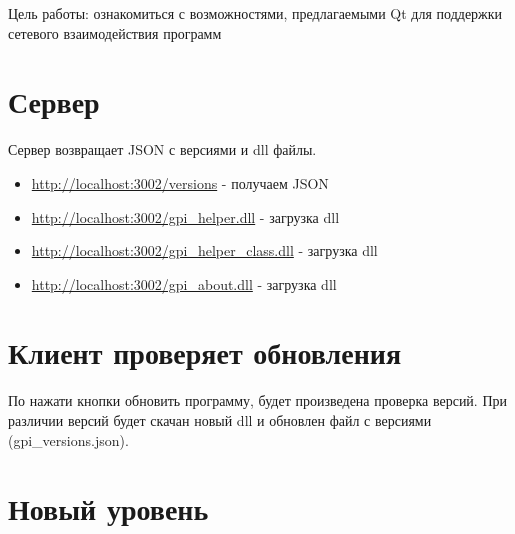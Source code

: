 

Цель работы:
ознакомиться с возможностями, предлагаемыми Qt для поддержки сетевого взаимодействия программ


\section{Сервер}

Сервер возвращает JSON с версиями и dll файлы.

\begin{itemize}
    \item \url{http://localhost:3002/versions} - получаем JSON
    \item \url{http://localhost:3002/gpi_helper.dll} - загрузка dll
    \item \url{http://localhost:3002/gpi_helper_class.dll} - загрузка dll
    \item \url{http://localhost:3002/gpi_about.dll} - загрузка dll
\end{itemize}








\section{Клиент проверяет обновления}

По нажати кнопки обновить программу, будет произведена проверка версий.
При различии версий будет скачан новый dll и обновлен файл с версиями (gpi\_versions.json). 







\section{Новый уровень}

